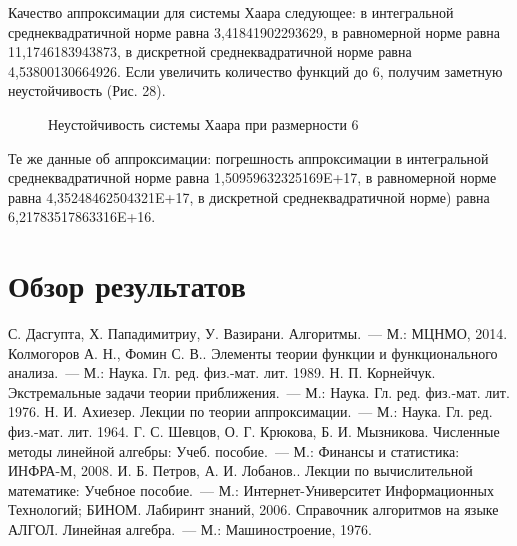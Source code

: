 ﻿\documentclass[a4paper, 12pt]{article}
\begin{document}
Качество аппроксимации для системы Хаара следующее: в интегральной среднеквадратичной норме равна 3,41841902293629, в равномерной норме равна 11,1746183943873, в дискретной среднеквадратичной норме равна 4,53800130664926. Если увеличить количество функций до 6, получим заметную неустойчивость (Рис. 28). 

\begin{figure}[h!]
    \noindent{}
   \caption{Неустойчивость системы Хаара при размерности 6}
    \label{figCurves}
\end{figure}

Те же данные об аппроксимации: погрешность аппроксимации в интегральной среднеквадратичной норме равна 1,50959632325169E+17, в равномерной норме равна 4,35248462504321E+17, в дискретной среднеквадратичной норме) равна 6,21783517863316E+16.



\section{Обзор результатов}


\begin{thebibliography}{999} 
    С. Дасгупта, Х. Пападимитриу, У. Вазирани. Алгоритмы.~---
    М.: МЦНМО, 2014.
    Колмогоров А. Н., Фомин С. В.. Элементы теории функции и функционального анализа.~---
    М.: Наука. Гл. ред. физ.-мат. лит. 1989.
    Н. П. Корнейчук. Экстремальные задачи теории приближения.~---
    М.: Наука. Гл. ред. физ.-мат. лит. 1976.
    Н. И. Ахиезер. Лекции по теории аппроксимации.~---
    М.: Наука. Гл. ред. физ.-мат. лит. 1964.
    Г. С. Шевцов, О. Г. Крюкова, Б. И. Мызникова. Численные методы линейной алгебры: Учеб. пособие.~---
    М.: Финансы и статистика: ИНФРА-М, 2008.
    И. Б. Петров, А. И. Лобанов.. Лекции по вычислительной математике: Учебное пособие.~---
    М.: Интернет-Университет Информационных Технологий; БИНОМ. Лабиринт знаний, 2006.
    Справочник алгоритмов на языке АЛГОЛ. Линейная алгебра.~---
    М.: Машиностроение, 1976.
\end{thebibliography}
\end{document}
